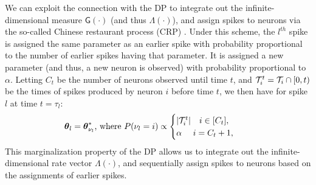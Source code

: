 We can exploit the connection with the DP to %
integrate out the infinite-dimensional measure $\mathsf{G}(\cdot)$ (and thus $\mathsf{\Lambda}(\cdot)$), and assign spikes to neurons via 
the so-called Chinese restaurant process (CRP) \citep{Pit2002a}. Under this scheme, the $l^{th}$ spike is assigned the same parameter as an earlier spike with probability 
proportional to the number of earlier spikes having that parameter. It is assigned a new parameter (and thus, a new neuron is observed) with probability 
proportional to $\alpha$. Letting $C_t$ be the number of neurons observed until time $t$, and  $\mathcal{T}^t_i = \mathcal{T}_i \cap [0,t)$ be the times of spikes 
produced by neuron $i$ before time $t$,
we then have for spike $l$ at time $t = \tau_l$: 
\vspace{-.06in}
\begin{align}
 \boldsymbol{\theta}_l = \boldsymbol{\theta}^*_{\nu_l} \text{, where } 
  P({\nu_l} = i) & \propto 
  \begin{cases}
   |\mathcal{T}^t_i| \quad i \in [C_{t}], \\
   \alpha \quad\ i = C_{t} + 1, 
  \end{cases}  
\label{eq:crp_marg_pr}
\end{align}
This marginalization property of the DP allows us to integrate out the infinite-dimensional rate vector $\mathsf{\Lambda}(\cdot)$, and sequentially 
assign spikes to neurons based on the assignments of earlier spikes.
